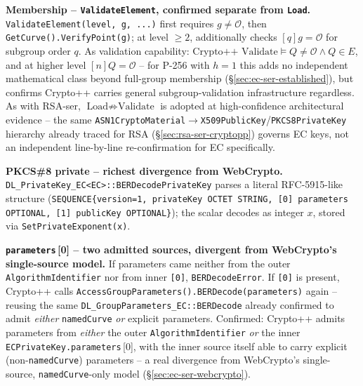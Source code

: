 \documentclass[11pt,a4paper]{article}
\begin{document}
\textbf{Membership -- \texttt{ValidateElement}, confirmed separate from \texttt{Load}.} \texttt{ValidateElement(level, g, ...)} first requires $g\neq\mathcal{O}$, then \texttt{GetCurve().VerifyPoint(g)}; at level $\geq 2$, additionally checks $[q]g=\mathcal{O}$ for subgroup order $q$. As validation capability: $\text{Crypto++ Validate} \models Q\neq\mathcal{O} \wedge Q\in E$, and at higher level $[n]Q=\mathcal{O}$ -- for P-256 with $h=1$ this adds no independent mathematical class beyond full-group membership (\S\ref{sec:ec-ser-established}), but confirms Crypto++ carries general subgroup-validation infrastructure regardless. As with RSA-ser, $\text{Load} \not\Rightarrow \text{Validate}$ is adopted at high-confidence architectural evidence -- the same \texttt{ASN1CryptoMaterial}$\to$\texttt{X509PublicKey}/\texttt{PKCS8PrivateKey} hierarchy already traced for RSA (\S\ref{sec:rsa-ser-cryptopp}) governs EC keys, not an independent line-by-line re-confirmation for EC specifically.

\textbf{PKCS\#8 private -- richest divergence from WebCrypto.} \texttt{DL\_PrivateKey\_EC<EC>::BERDecodePrivateKey} parses a literal RFC-5915-like structure (\texttt{SEQUENCE\{version=1, privateKey OCTET STRING, [0] parameters OPTIONAL, [1] publicKey OPTIONAL\}}); the scalar decodes as integer $x$, stored via \texttt{SetPrivateExponent(x)}.

\textbf{\texttt{parameters}\,[0] -- two admitted sources, divergent from WebCrypto's single-source model.} If parameters came neither from the outer \texttt{AlgorithmIdentifier} nor from inner \texttt{[0]}, \texttt{BERDecodeError}. If \texttt{[0]} is present, Crypto++ calls \texttt{AccessGroupParameters().BERDecode(parameters)} again -- reusing the same \texttt{DL\_GroupParameters\_EC::BERDecode} already confirmed to admit \emph{either} \texttt{namedCurve} \emph{or} explicit parameters. Confirmed: Crypto++ admits parameters from \emph{either} the outer \texttt{AlgorithmIdentifier} \emph{or} the inner \texttt{ECPrivateKey.parameters}\,[0], with the inner source itself able to carry explicit (non-\texttt{namedCurve}) parameters -- a real divergence from WebCrypto's single-source, \texttt{namedCurve}-only model (\S\ref{sec:ec-ser-webcrypto}).
\end{document}
